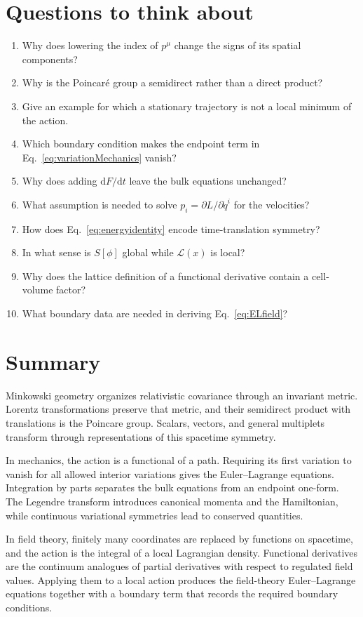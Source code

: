 \documentclass[11pt]{article}
\newcommand{\dd}{\mathrm{d}}
\newcommand{\Lag}{\mathcal{L}}
\begin{document}
\section{Questions to think about}

\begin{enumerate}
  \item Why does lowering the index of \(p^\mu\) change the signs of its
  spatial components?
  \item Why is the Poincaré group a semidirect rather than a direct product?
  \item Give an example for which a stationary trajectory is not a local
  minimum of the action.
  \item Which boundary condition makes the endpoint term in
  Eq.~\eqref{eq:variationMechanics} vanish?
  \item Why does adding \(\dd F/\dd t\) leave the bulk equations unchanged?
  \item What assumption is needed to solve \(p_i=\partial L/\partial\dot q^i\)
  for the velocities?
  \item How does Eq.~\eqref{eq:energyidentity} encode time-translation
  symmetry?
  \item In what sense is \(S[\phi]\) global while \(\Lag(x)\) is local?
  \item Why does the lattice definition of a functional derivative contain a
  cell-volume factor?
  \item What boundary data are needed in deriving Eq.~\eqref{eq:ELfield}?
\end{enumerate}

\section*{Summary}

Minkowski geometry organizes relativistic covariance through an invariant
metric. Lorentz transformations preserve that metric, and their semidirect
product with translations is the Poincare group. Scalars, vectors, and
general multiplets transform through representations of this spacetime
symmetry.

In mechanics, the action is a functional of a path. Requiring its first
variation to vanish for all allowed interior variations gives the
Euler--Lagrange equations. Integration by parts separates the bulk equations
from an endpoint one-form. The Legendre transform introduces canonical
momenta and the Hamiltonian, while continuous variational symmetries lead to
conserved quantities.

In field theory, finitely many coordinates are replaced by functions on
spacetime, and the action is the integral of a local Lagrangian density.
Functional derivatives are the continuum analogues of partial derivatives
with respect to regulated field values. Applying them to a local action
produces the field-theory Euler--Lagrange equations together with a boundary
term that records the required boundary conditions.
\end{document}
